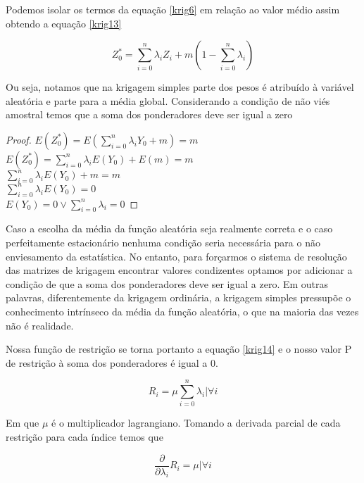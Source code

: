  Podemos isolar os termos da equação \eqref{krig6} em relação ao valor médio assim obtendo a equação \eqref{krig13}
 
 \begin{equation}\label{krig13}
 Z^*_{0} = \sum_{i=0}^{n} \lambda_{i} Z_{i} + m\left(1- \sum_{i=0}^{n}\lambda_{i} \right)
 \end{equation} 

Ou seja, notamos que na krigagem simples parte dos pesos é atribuído à variável aleatória e parte para a média global. Considerando a condição de não viés amostral temos que a soma dos ponderadores deve ser igual a zero 

\begin{proof}
$E\left(Z^*_{0}\right) = E\left(\sum_{i=0}^{n} \lambda_{i}Y_{0} + m \right) = m $\\
$E\left(Z^*_{0}\right) = \sum_{i=0}^{n} \lambda_{i}E\left( Y_{0} \right) + E(m) = m $\\
$\sum_{i=0}^{n} \lambda_{i}E\left( Y_{0} \right) + m = m $\\
$\sum_{i=0}^{n} \lambda_{i}E\left( Y_{0} \right)  = 0 $\\
$E\left( Y_{0} \right)  = 0 \vee \sum_{i=0}^{n} \lambda_{i} = 0 $
\end{proof}

Caso a escolha da média da função aleatória seja realmente correta e o caso perfeitamente estacionário nenhuma condição seria necessária para o não enviesamento da estatística. No entanto, para forçarmos o sistema de resolução das matrizes de krigagem encontrar valores condizentes optamos por adicionar a condição de que a soma dos ponderadores deve ser igual a zero. Em outras palavras, diferentemente da krigagem ordinária, a krigagem simples pressupõe o conhecimento intrínseco da média da função aleatória, o que na maioria das vezes não é realidade.

Nossa função de restrição se torna portanto a equação \eqref{krig14} e o nosso valor P de restrição à soma dos ponderadores é igual a 0.

\begin{equation}\label{krig14}
R_{i} = \mu \sum_{i=0}^{n} \lambda_{i} | \forall i
\end{equation}   

Em que $\mu$ é o multiplicador lagrangiano. Tomando a derivada parcial de cada restrição para cada índice temos que

\begin{equation}\label{krig15}
\frac{\partial}{\partial \lambda_{i}}R_{i} = \mu | \forall i 
\end{equation} 


